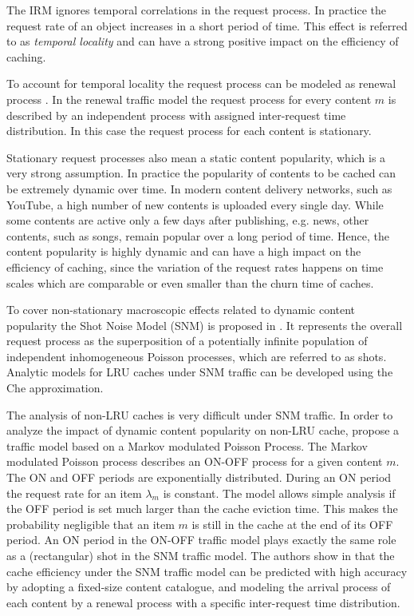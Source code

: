 The IRM ignores temporal correlations in the request process.
In practice the request rate of an object increases in a short period of time.
This effect is referred to as \textit{temporal locality} and can have a strong positive impact on the efficiency of caching.

To account for temporal locality the request process can be modeled as renewal process \cite{martina2014unified}.
In the renewal traffic model the request process for every content $m$ is described by an independent process with assigned inter-request time distribution.
In this case the request process for each content is stationary.

Stationary request processes also mean a static content popularity, which is a very strong assumption.
In practice the popularity of contents to be cached can be extremely dynamic over time.
In modern content delivery networks, such as YouTube, a high number of new contents is uploaded every single day.
While some contents are active only a few days after publishing, e.g. news, other contents, such as songs, remain popular over a long period of time.
Hence, the content popularity is highly dynamic and can have a high impact on the efficiency of caching, since the variation of the request rates happens on time scales which are comparable or even smaller than the churn time of caches.

To cover non-stationary macroscopic effects related to dynamic content popularity the Shot Noise Model (SNM) is proposed in \cite{traverso2013temporal}.
It represents the overall request process as the superposition of a potentially infinite population of independent inhomogeneous Poisson processes, which are referred to as shots.
Analytic models for LRU caches under SNM traffic can be developed using the Che approximation.

The analysis of non-LRU caches is very difficult under SNM traffic.
In order to analyze the impact of dynamic content popularity on non-LRU cache, \cite{garetto2014dynamic} propose a traffic model based on a Markov modulated Poisson Process.
The Markov modulated Poisson process describes an ON-OFF process for a given content $m$.
The ON and OFF periods are exponentially distributed.
During an ON period the request rate for an item $\lambda_m$ is constant.
The model allows simple analysis if the OFF period is set much larger than the cache eviction time.
This makes the probability negligible that an item $m$ is still in the cache at the end of its OFF period.
An ON period in the ON-OFF traffic model plays exactly the same role as a (rectangular) shot in the SNM traffic model.
The authors show in \cite{garetto2014dynamic} that the cache efficiency under the SNM traffic model can be predicted with high accuracy by adopting a fixed-size content catalogue, and modeling the arrival process of each content by a renewal process with a specific inter-request time distribution.

